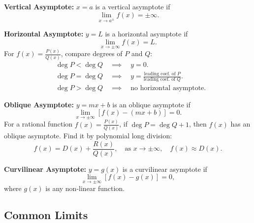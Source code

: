 \documentclass[a4paper,11pt]{article}
\begin{document}
\begin{tcolorbox}[breakable]
    \textbf{Vertical Asymptote:} 
    $x = a$ is a vertical asymptote if  
    \[
    \lim_{x \to a^{\pm}} f(x) = \pm \infty.
    \]
    
    \textbf{Horizontal Asymptote:}
    $y = L$ is a horizontal asymptote if  
    \[
    \lim_{x \to \pm \infty} f(x) = L.
    \]
    For $f(x) = \frac{P(x)}{Q(x)}$, compare degrees of $P$ and $Q$:  
    \[
    \begin{aligned}
        &\deg P < \deg Q \quad \implies \quad y = 0. \\  
        &\deg P = \deg Q \quad \implies \quad y = \frac{\text{leading coef. of } P}{\text{leading coef. of } Q}. \\  
        &\deg P > \deg Q \quad \implies \quad \text{no horizontal asymptote}.
    \end{aligned}
    \]

    \textbf{Oblique Asymptote:}
    $y = mx + b$ is an oblique asymptote if  
    \[
    \lim_{x \to \pm \infty} [f(x) - (mx + b)] = 0.
    \]
    For a rational function $f(x) = \frac{P(x)}{Q(x)}$, if $\deg P = \deg Q + 1$, then $f(x)$ has an oblique asymptote.  
    Find it by polynomial long division:  
    \[
    f(x) = D(x) + \frac{R(x)}{Q(x)}, \quad \text{as } x \to \pm \infty, \quad f(x) \approx D(x).
    \]
    
    \textbf{Curvilinear Asymptote:}
    $y = g(x)$ is a curvilinear asymptote if
    \[
    \lim_{x \to \pm \infty} [f(x) - g(x)] = 0,
    \]
    where $g(x)$ is any non-linear function.
\end{tcolorbox}




\subsection{Common Limits}
\end{document}
